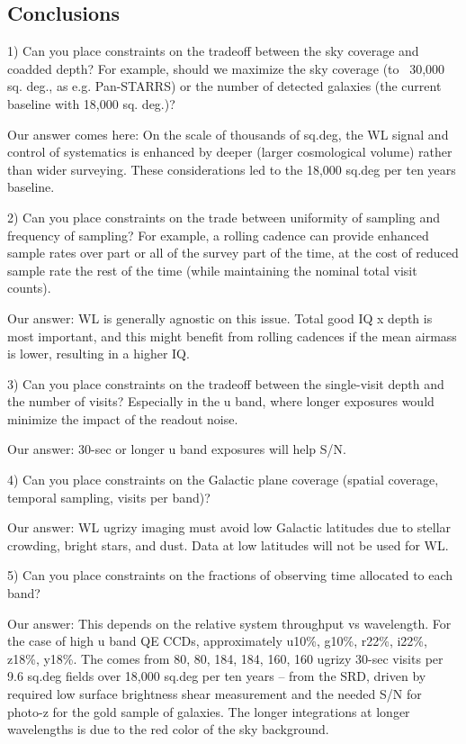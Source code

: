 \subsection{Conclusions}

1) Can you place constraints on the tradeoff between the sky coverage and coadded depth?
For example, should we maximize the sky coverage (to ~30,000 sq. deg., as e.g. Pan-STARRS)
or the number of detected galaxies (the current baseline with 18,000 sq. deg.)?

Our answer comes here: On the scale of thousands of sq.deg, the WL signal and control of systematics is enhanced by deeper (larger cosmological volume) rather than wider surveying. These considerations led to the 18,000 sq.deg per ten years baseline.

2) Can you place constraints on the trade between uniformity of sampling and frequency of 
sampling? For example, a rolling cadence can provide enhanced sample rates over part or all 
of the survey part of the time, at the cost of reduced sample rate the rest of the time (while 
maintaining the nominal total visit counts).

Our answer: WL is generally agnostic on this issue. Total good IQ x depth is most important, and this might benefit from rolling cadences if the mean airmass is lower, resulting in a higher IQ.

3) Can you place constraints on the tradeoff between the single-visit depth and the number 
of visits? Especially in the u band, where longer exposures would minimize the impact of the 
readout noise.

Our answer: 30-sec or longer u band exposures will help S/N.

4) Can you place constraints on the Galactic plane coverage (spatial coverage, temporal 
sampling, visits per band)?

Our answer: WL ugrizy imaging must avoid low Galactic latitudes due to stellar crowding, bright stars, and dust. Data at low latitudes will not be used for WL.

5) Can you place constraints on the fractions of observing time allocated to each band?

Our answer: This depends on the relative system throughput vs wavelength. For the case of high u band QE CCDs, approximately u10\%, g10\%, r22\%, i22\%, z18\%, y18\%. The comes from 80, 80, 184, 184, 160, 160 ugrizy 30-sec visits per 9.6 sq.deg fields over 18,000 sq.deg per ten years -- from the SRD, driven by required low surface brightness shear measurement and the needed S/N for photo-z for the gold sample of galaxies. The longer integrations at longer wavelengths is due to the red color of the sky background.

